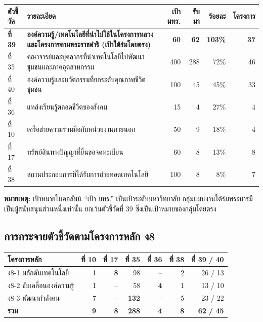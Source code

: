 \documentclass[12pt,a4paper]{article}
\begin{document}
\begin{center}\small
\setlength{\tabcolsep}{5pt}\renewcommand{\arraystretch}{1.3}
\begin{tabular}{p{1.5cm}p{6.1cm}rrrr}
\toprule
\rowcolor{rpfnavy!12}
\textbf{ตัวชี้วัด} & \textbf{รายละเอียด} & \textbf{เป้า มทร.} & \textbf{รับมา} & \textbf{ร้อยละ} & \textbf{โครงการ}\\
\midrule
\rowcolor{rpfgreen!12}
\textbf{ที่ 39} & \textbf{องค์ความรู้/เทคโนโลยีที่นำไปใช้ในโครงการหลวงและโครงการตามพระราชดำริ (เป้าใต้ร่มโดยตรง)} & \textbf{60} & \textbf{62} & \textbf{103\%} & \textbf{37}\\
ที่ 35 & คณาจารย์และบุคลากรที่นำเทคโนโลยีไปพัฒนาชุมชนและภาคอุตสาหกรรม & 400 & 288 & 72\% & 46\\
ที่ 40 & องค์ความรู้และนวัตกรรมที่ยกระดับคุณภาพชีวิตชุมชน & 100 & 45 & 45\% & 33\\
ที่ 36 & แหล่งเรียนรู้ตลอดชีวิตของสังคม & 15 & 4 & 27\% & 4\\
\rowcolor{rpfred!8}
ที่ 10 & เครือข่ายความร่วมมือกับหน่วยงานภายนอก & 50 & 9 & 18\% & 4\\
\rowcolor{rpfred!8}
ที่ 17 & ทรัพย์สินทางปัญญาที่ยื่นขอจดทะเบียน & 60 & 8 & 13\% & 8\\
\rowcolor{rpfred!8}
ที่ 38 & สถานประกอบการที่ได้รับการถ่ายทอดเทคโนโลยี & 100 & 8 & 8\% & 7\\
\bottomrule
\end{tabular}
\end{center}

{\footnotesize \textbf{หมายเหตุ:} เป้าหมายในคอลัมน์ ``เป้า มทร.'' เป็นเป้าระดับมหาวิทยาลัย
กลุ่มแผนงานใต้ร่มพระบารมีเป็นผู้สนับสนุนส่วนหนึ่งเท่านั้น ยกเว้นตัวชี้วัดที่ 39 ซึ่งเป็นเป้าหมายของกลุ่มโดยตรง}

\subsection{การกระจายตัวชี้วัดตามโครงการหลัก ง8}

\begin{center}\small
\setlength{\tabcolsep}{6pt}\renewcommand{\arraystretch}{1.3}
\begin{tabular}{p{3.4cm}rrrrrr}
\toprule
\rowcolor{rpfnavy!12}
\textbf{โครงการหลัก} & \textbf{ที่ 10} & \textbf{ที่ 17} & \textbf{ที่ 35} & \textbf{ที่ 36} & \textbf{ที่ 38} & \textbf{ที่ 39 / 40}\\
\midrule
ง8-1 ผลักดันเทคโนโลยี & 1 & \textbf{8} & 98 & -- & 2 & 26 / 13\\
ง8-2 ขับเคลื่อนองค์ความรู้ & 1 & -- & 58 & \textbf{4} & 1 & 13 / 10\\
ง8-3 พัฒนากำลังคน & 7 & -- & \textbf{132} & -- & 5 & 23 / 22\\
\midrule
\rowcolor{rpfgold!15}
\textbf{รวม} & \textbf{9} & \textbf{8} & \textbf{288} & \textbf{4} & \textbf{8} & \textbf{62 / 45}\\
\bottomrule
\end{tabular}
\end{center}
\end{document}
